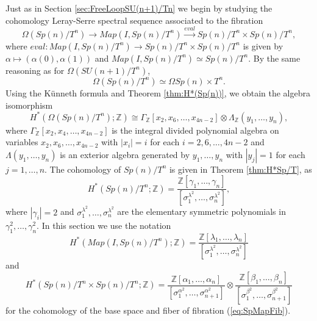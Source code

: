 \documentclass{article}
\theoremstyle{plain}
\theoremstyle{definition}
\numberwithin{thm}{section}
\begin{document}
		Just as in Section \ref{sec:FreeLoopSU(n+1)/Tn}
		we begin by studying the cohomology Leray-Serre spectral sequence associated to the fibration
		\begin{equation}\label{eq:SpMapFib}
			\Omega (Sp(n)/T^n) \to Map(I,Sp(n)/T^n) \xrightarrow{eval} Sp(n)/T^n\times Sp(n)/T^n,
		\end{equation}
		where $eval \colon Map(I,Sp(n)/T^n)\to Sp(n)/T^n\times Sp(n)/T^n$ is given by $\alpha\mapsto (\alpha(0),\alpha(1))$ and $Map(I,Sp(n)/T^n)\simeq Sp(n)/T^n$.
		By the same reasoning as for $\Omega(SU(n+1)/T^n)$,
		\begin{equation*}
			\Omega(Sp(n)/T^n)\simeq \Omega Sp(n) \times T^n.
		\end{equation*}
		Using the K\"{u}nneth formula and Theorem \ref{thm:H*(Sp(n))}, we obtain the algebra isomorphism
		\begin{equation*}
			H^*(\Omega(Sp(n)/T^n);\mathbb{Z})
			\cong \Gamma_{\mathbb{Z}}[x_2,x_6,\dots,x_{4n-2}] \otimes \Lambda_{\mathbb{Z}}(y_1,\dots,y_n),
		\end{equation*}
		where $\Gamma_{\mathbb{Z}}[x_2,x_4,\dots,x_{4n-2}]$ is the integral divided polynomial algebra on variables $x_2,x_6,\dots,x_{4n-2}$
		with $|x_i|=i$ for each $i=2,6,\dots,4n-2$
		and $\Lambda(y_1,\dots,y_n)$ is an exterior algebra generated by $y_1,\dots,y_n$
		with $|y_j|=1$ for each $j=1,\dots,n$.
		The cohomology of $Sp(n)/T^n$ is given in Theorem \ref{thm:H*Sp/T}, as
		\begin{equation*}
			H^*(Sp(n)/T^n;\mathbb{Z})=\frac{\mathbb{Z}[\gamma_1,\dots,\gamma_n]}{[\sigma_1^{\lambda^2},\dots,\sigma_{n}^{\lambda^2}]},
			\end{equation*}
		where $|\gamma_i|=2$ and $\sigma_1^{\lambda^2},\dots,\sigma_n^{\lambda^2}$ are the elementary symmetric polynomials in $\gamma_1^{2},\dots,\gamma_n^2$.
		In this section we use the notation
		\begin{equation*}
			H^*(Map(I,Sp(n)/T^n);\mathbb{Z}) = \frac{\mathbb{Z}[\lambda_1,\dots,\lambda_n]}{[{\sigma^{\lambda^2}_1},\dots,{\sigma^{\lambda^2}_n}]}
		\end{equation*}
		and
		\begin{equation*}
			H^*(Sp(n)/T^n \times Sp(n)/T^n;\mathbb{Z}) = 
			\frac{\mathbb{Z}[\alpha_1,\dots,\alpha_n]}{[{\sigma^{\alpha^2}_1},\dots,{\sigma^{\alpha^2}_{n+1}}]} \otimes
			\frac{\mathbb{Z}[\beta_1,\dots,\beta_n]}{[{\sigma^{\beta^2}_1},\dots,{\sigma^{\beta^2}_{n+1}}]}
		\end{equation*}
		for the cohomology of the base space and fiber of fibration (\ref{eq:SpMapFib}).
\end{document}
